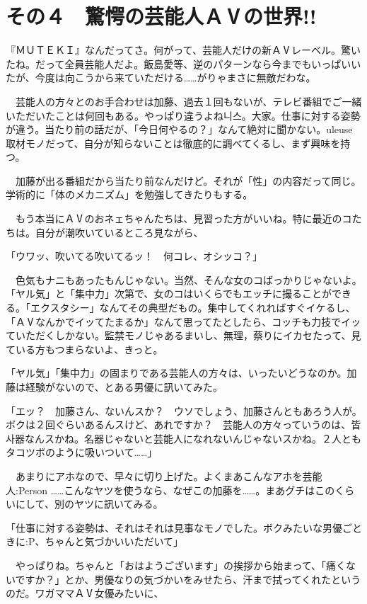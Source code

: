 \documentclass[12pt,UTF8]{ctexbook}
\begin{document}
{%
\chapter{その４　驚愕の芸能人ＡⅤの世界!!}
\label{chap:04}


『ＭＵＴＥＫＩ』なんだってさ。何がって、芸能人だけの新ＡⅤレーベル。驚いたね。だって全員芸能人だよ。飯島愛等、逆のパターンなら今までもいっぱいいたが、今度は向こうから来ていただける……がりゃまさに無敵だわな。

　芸能人の方々とのお手合わせは加藤、過去１回もないが、テレビ番組でご一緒いただいたことは何回もある。やっぱり違うよね니스。大家。仕事に対する姿勢が違う。当たり前の話だが、「今日何やるの？」なんて絶対に聞かない。uleuse取材モノだって、自分が知らないことは徹底的に調べてくるし、まず興味を持つ。

　加藤が出る番組だから当たり前なんだけど。それが「性」の内容だって同じ。学術的に「体のメカニズム」を勉強してきたりもする。

　もう本当にＡⅤのおネェちゃんたちは、見習った方がいいね。特に最近のコたちは。自分が潮吹いているところ見ながら、

「ウワッ、吹いてる吹いてるッ！　何コレ、オシッコ？」

　色気もナニもあったもんじゃない。当然、そんな女のコばっかりじゃないよ。「ヤル気」と「集中力」次第で、女のコはいくらでもエッチに撮ることができる。「エクスタシー」なんてその典型だもの。集中してくれればすぐイケるし、「ＡⅤなんかでイッてたまるか」なんて思ってたとしたら、コッチも力技でイッていただくしかない。監禁モノじゃあるまいし、無理，蔡りにイカセたって、見ている方もつまらないよ、きっと。

「ヤル気」「集中力」の固まりである芸能人の方々は、いったいどうなのか。加藤は経験がないので、とある男優に訊いてみた。

「エッ？　加藤さん、ないんスか？　ウソでしょう、加藤さんともあろう人が。ボクは２回ぐらいあるんスけど、あれですか？　芸能人の方々っていうのは、皆사器なんスかね。名器じゃないと芸能人になれないんじゃないスかね。２人ともタコツボのように吸いついて……」

　あまりにアホなので、早々に切り上げた。よくまあこんなアホを芸能人:Person ……こんなヤツを使うなら、なぜこの加藤を……。まあグチはこのくらいにして、別のヤツに訊いてみる。

「仕事に対する姿勢は、それはそれは見事なモノでした。ボクみたいな男優ごときに:P、ちゃんと気づかいいただいて」

　やっぱりね。ちゃんと「おはようございます」の挨拶から始まって、「痛くないですか？」とか、男優なりの気づかいをみせたら、汗まで拭ってくれたというのだ。ワガママＡⅤ女優みたいに、

}
\end{document}
